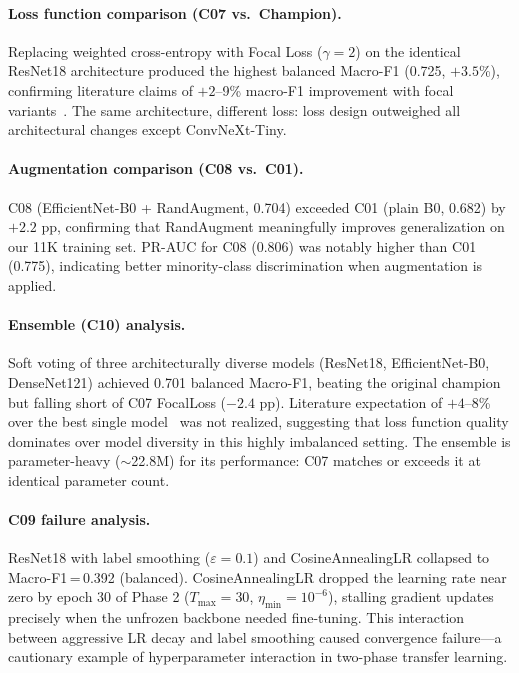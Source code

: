 \documentclass[11pt, letterpaper]{article}
\begin{document}
\paragraph{Loss function comparison (C07 vs.\ Champion).}
Replacing weighted cross-entropy with Focal Loss ($\gamma=2$) on the identical
ResNet18 architecture produced the highest balanced Macro-F1 (0.725, $+3.5$\%),
confirming literature claims of $+2$--9\% macro-F1 improvement with focal
variants~\cite{focalloss}. The same architecture, different loss: loss design
outweighed all architectural changes except ConvNeXt-Tiny.

\paragraph{Augmentation comparison (C08 vs.\ C01).}
C08 (EfficientNet-B0 + RandAugment, 0.704) exceeded C01 (plain B0, 0.682)
by $+2.2$ pp, confirming that RandAugment meaningfully improves generalization
on our 11K training set. PR-AUC for C08 (0.806) was notably higher than C01
(0.775), indicating better minority-class discrimination when augmentation is
applied.

\paragraph{Ensemble (C10) analysis.}
Soft voting of three architecturally diverse models (ResNet18, EfficientNet-B0,
DenseNet121) achieved 0.701 balanced Macro-F1, beating the original champion
but falling short of C07 FocalLoss ($-2.4$ pp). Literature expectation of
$+4$--8\% over the best single model~\cite{ensemble25} was not realized,
suggesting that loss function quality dominates over model diversity in this
highly imbalanced setting. The ensemble is parameter-heavy ($\sim$22.8M) for
its performance: C07 matches or exceeds it at identical parameter count.

\paragraph{C09 failure analysis.}
ResNet18 with label smoothing ($\varepsilon=0.1$) and CosineAnnealingLR
collapsed to Macro-F1\,=\,0.392 (balanced). CosineAnnealingLR dropped the
learning rate near zero by epoch 30 of Phase 2 ($T_\text{max}=30$,
$\eta_\text{min}=10^{-6}$), stalling gradient updates precisely when the
unfrozen backbone needed fine-tuning. This interaction between aggressive
LR decay and label smoothing caused convergence failure---a cautionary example
of hyperparameter interaction in two-phase transfer learning.
\end{document}
